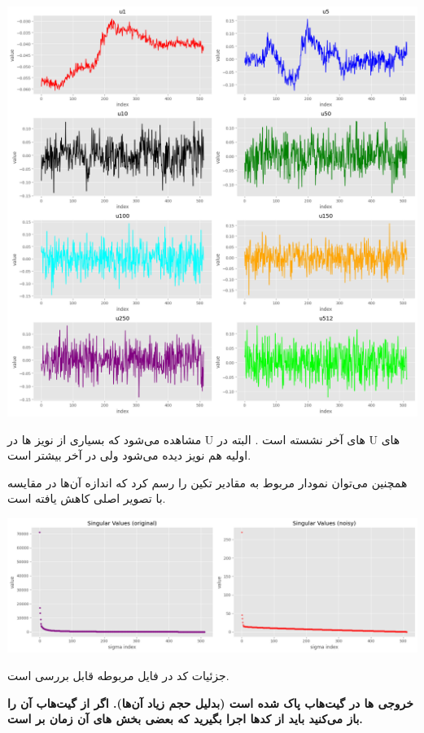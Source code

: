 \documentclass[a4paper, 12pt]{article}
\begin{document}
\begin{center}
	\includegraphics[scale=0.4]{fig4.png}
\end{center}
مشاهده می‌شود که بسیاری از نویز ها در U های آخر نشسته است . البته در U های اولیه هم نویز دیده می‌شود ولی در آخر بیشتر است. 

همچنین می‌توان نمودار مربوط به مقادیر تکین را رسم کرد که اندازه آن‌ها در مقایسه با تصویر اصلی کاهش یافته است.
\begin{center}
	\includegraphics[scale=0.4]{fig5.png}
\end{center}

جزئیات کد در فایل مربوطه قابل بررسی است.

\textbf{خروجی ها در گیت‌هاب پاک شده است (بدلیل حجم زیاد آن‌ها). اگر از گیت‌هاب آن را باز می‌کنید باید از کد‌ها اجرا بگیرید که بعضی بخش های آن زمان بر است.}
	
	
\end{document}
